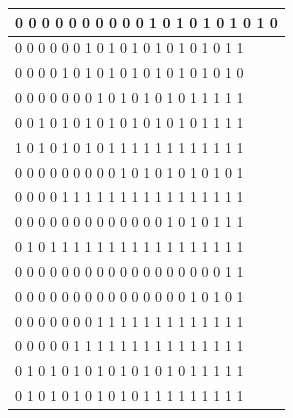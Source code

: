 \documentclass[11pt, a4paper]{article}
\begin{document}
\begin{enumerate}
\begin{table}[http]
\begin{tabular}{|l|}
			0     0     0     0     0     0     0     0     0     0     1     0     1     0     1     0     1     0     1     0 \\ \hline
			0     0     0     0     0     0     1     0     1     0     1     0     1     0     1     0     1     0     1     1 \\ \hline
			0     0     0     0     1     0     1     0     1     0     1     0     1     0     1     0     1     0     1     0 \\ \hline
			0     0     0     0     0     0     0     1     0     1     0     1     0     1     0     1     1     1     1     1 \\ \hline
			0     0     1     0     1     0     1     0     1     0     1     0     1     0     1     0     1     1     1     1 \\ \hline
			1     0     1     0     1     0     1     0     1     1     1     1     1     1     1     1     1     1     1     1 \\ \hline
			0     0     0     0     0     0     0     0     0     1     0     1     0     1     0     1     0     1     0     1 \\ \hline
			0     0     0     0     1     1     1     1     1     1     1     1     1     1     1     1     1     1     1     1 \\ \hline
			0     0     0     0     0     0     0     0     0     0     0     0     0     1     0     1     0     1     1     1 \\ \hline
			0     1     0     1     1     1     1     1     1     1     1     1     1     1     1     1     1     1     1     1 \\ \hline
			0     0     0     0     0     0     0     0     0     0     0     0     0     0     0     0     0     0     1     1 \\ \hline
			0     0     0     0     0     0     0     0     0     0     0     0     0     0     0     1     0     1     0     1 \\ \hline
			0     0     0     0     0     0     0     1     1     1     1     1     1     1     1     1     1     1     1     1 \\ \hline
			0     0     0     0     0     1     1     1     1     1     1     1     1     1     1     1     1     1     1     1 \\ \hline
			0     1     0     1     0     1     0     1     0     1     0     1     0     1     0     1     1     1     1     1 \\ \hline
			0     1     0     1     0     1     0     1     0     1     0     1     1     1     1     1     1     1     1     1 \\ \hline

\end{tabular}
\end{table}
\end{enumerate}
\end{document}
